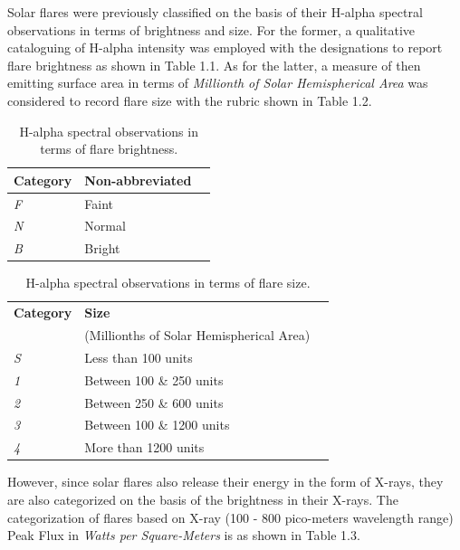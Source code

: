 \documentclass[12pt,twoside]{reedthesis}
\begin{document}
Solar flares were previously classified on the basis of their H-alpha spectral observations in terms of brightness and size. For the former, a qualitative cataloguing of H-alpha intensity was employed with the designations to report flare brightness as shown in Table 1.1.  As for the latter, a measure of then emitting surface area in terms of \textit{Millionth of Solar Hemispherical Area} was considered to record flare size with the rubric shown in Table 1.2.\\

\begin{table}[h]
	\centering %
	\begin{tabular}{lp{5cm}l}
		\hline
		\textbf{Category} &  \textbf{Non-abbreviated} \\
		\hline
		\textit{F}  		&  Faint \\
		\textit{N}  		&  Normal \\
		\textit{B}  		&  Bright \\
		\hline
	\end{tabular}
	\caption{H-alpha spectral observations in terms of flare brightness.}
	\end{table}

	
	
\begin{table}[h]
	\centering %
	\begin{tabular}{lp{5cm}l}
		\hline
		\textbf{Category} &  \textbf{Size} \\ & (Millionths of Solar Hemispherical Area) \\
		\hline
		\textit{S}  		&  Less than 100 units \\
		\textit{1}  		&  Between 100 \& 250 units\\
		\textit{2}  		&  Between 250 \& 600 units \\
		\textit{3}  		&  Between 100 \& 1200 units \\
		\textit{4}  		&  More than 1200 units \\
		\hline
	\end{tabular}
	\caption{H-alpha spectral observations in terms of flare size.}
	\end{table}
	
	However, since solar flares also release their energy in the form of X-rays, they are also categorized on the basis of the brightness in their X-rays. The categorization of flares based on X-ray (100 - 800 pico-meters wavelength range) Peak Flux in \textit{Watts per Square-Meters} is as shown in Table 1.3.  \\
\end{document}
